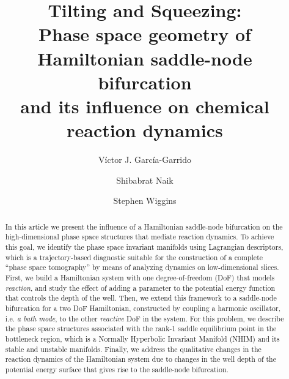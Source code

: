 \documentclass{ws-ijbc}
\begin{document}
\catchline{}{}{}{}{} %


\title{Tilting and Squeezing: \\ Phase space geometry of Hamiltonian saddle-node bifurcation \\ and its influence on chemical reaction dynamics}


\author{V\'ictor J. Garc\'ia-Garrido}
\address{Departamento de F\'isica y Matem\'aticas, \\ Universidad de Alcal\'a, Alcal\'a de Henares, 28871, Spain. \\ vjose.garcia@uah.es}

\author{Shibabrat Naik}
\address{School of Mathematics, University of Bristol, \\ Bristol BS8 1TW, United Kingdom. \\ s.naik@bristol.ac.uk}

\author{Stephen Wiggins}
\address{School of Mathematics, University of Bristol, \\ Bristol BS8 1TW, United Kingdom. \\ s.wiggins@bristol.ac.uk}

\maketitle

\begin{history}
\end{history}

\begin{abstract}
In this article we present the influence of a Hamiltonian saddle-node bifurcation on the high-dimensional phase space structures that mediate reaction dynamics. To achieve this goal, we identify the phase space invariant manifolds using Lagrangian descriptors, which is a trajectory-based diagnostic suitable for the construction of a complete ``phase space tomography'' by means of analyzing dynamics on low-dimensional slices. First, we build a Hamiltonian system with one degree-of-freedom (DoF) that models \textit{reaction}, and study the effect of adding a parameter to the potential energy function that controls the depth of the well. Then, we extend this framework to a saddle-node bifurcation for a two DoF Hamiltonian, constructed by coupling a harmonic oscillator, i.e. \textit{a bath mode}, to the other \textit{reactive} DoF in the system. For this problem, we describe the phase space structures associated with the rank-1 saddle equilibrium point in the bottleneck region, which is a Normally Hyperbolic Invariant Manifold (NHIM) and its stable and unstable manifolds. Finally, we address the qualitative changes in the reaction dynamics of the Hamiltonian system due to changes in the well depth of the potential energy surface that gives rise to the saddle-node bifurcation. 
\end{abstract}
\end{document}
